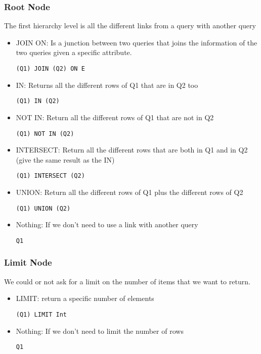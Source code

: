 \documentclass{article}
\begin{document}
\subsubsection{Root Node}
The first hierarchy level is all the different links from a query with another query
\begin{itemize}
\item JOIN ON: Is a junction between two queries that joins the information of the two queries given a specific attribute.
\begin{verbatim}
(Q1) JOIN (Q2) ON E
\end{verbatim}
\item IN: Returns all the different rows of Q1 that are in Q2 too
\begin{verbatim}
(Q1) IN (Q2)
\end{verbatim}
\item NOT IN: Return all the different rows of Q1 that are not in Q2
\begin{verbatim}
(Q1) NOT IN (Q2)
\end{verbatim}
\item INTERSECT: Return all the different rows that are both in Q1 and in Q2 (give the same result as the IN)
\begin{verbatim}
(Q1) INTERSECT (Q2)
\end{verbatim}
\item UNION: Return all the different rows of Q1 plus the different rows of Q2
\begin{verbatim}
(Q1) UNION (Q2)
\end{verbatim}
\item Nothing: If we don't need to use a link with another query
\begin{verbatim}
Q1
\end{verbatim}
\end{itemize}
\subsubsection{Limit Node}
We could or not ask for a limit on the number of items that we want to return.
\begin{itemize}
\item LIMIT: return a specific number of elements
\begin{verbatim}
(Q1) LIMIT Int
\end{verbatim}
\item Nothing:  If we don't need to limit the number of rows
\begin{verbatim}
Q1
\end{verbatim}
\end{itemize}
\end{document}
